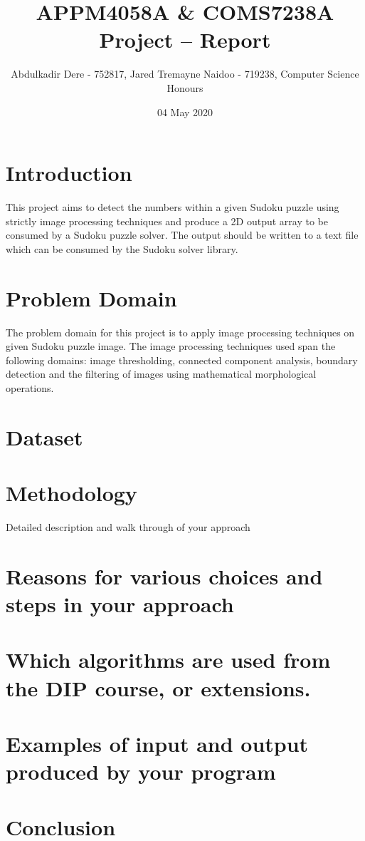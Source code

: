 

\title{APPM4058A \& COMS7238A Project -- Report}
\author{Abdulkadir Dere - 752817, Jared Tremayne Naidoo - 719238, Computer Science Honours}
\date{04 May 2020} 
\maketitle 
\pagestyle{fancy}
\fancyhf{}
\fancyhead[R]{\thepage}
{} 

\section{Introduction}
This project aims to detect the numbers within a given Sudoku puzzle using strictly image processing techniques and produce a 2D output array to be consumed by a Sudoku puzzle solver. The output should be written to a text file which can be consumed by the Sudoku solver library.

\section{Problem Domain}
The problem domain for this project is to apply image processing techniques on given Sudoku puzzle image. The image processing techniques used span the following domains: image thresholding, connected component analysis, boundary detection and the filtering of images using mathematical morphological operations. 

\section{Dataset}


\section{Methodology}
Detailed description and walk through of your approach

\section{Reasons for various choices and steps in your approach}
\section{Which algorithms are used from the DIP course, or extensions.}

\section{Examples of input and output produced by your program}

\section{Conclusion}




 
